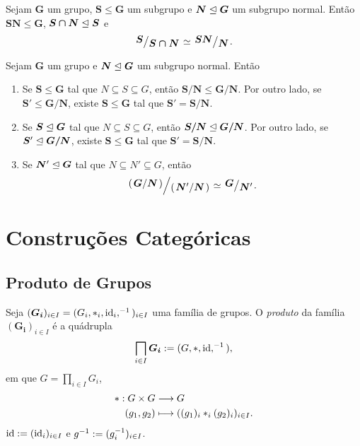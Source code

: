 \begin{teo}
Sejam $\bm G$ um grupo, $\bm S \leq \bm G$ um subgrupo e $\bm N \mathrel{\unlhd} \bm G$ um subgrupo normal. Então $\bm{SN} \leq \bm G$, $\bm{S \cap N} \mathrel{\unlhd} \bm S$ e
	\begin{equation*}
	\bm{\quo{S}{S \cap N}} \simeq \bm{\quo{SN}{N}}.
	\end{equation*}
\end{teo}

\begin{teo}
Sejam $\bm G$ um grupo e $\bm N \mathrel{\unlhd} \bm G$ um subgrupo normal. Então
	\begin{enumerate}
	\item Se $\bm S \leq \bm G$ tal que $N \subseteq S \subseteq G$, então $\bm{S/N} \leq \bm{G/N}$. Por outro lado, se $\bm S' \leq \bm{G/N}$, existe $\bm S \leq \bm G$ tal que $\bm S' = \bm{S/N}$.
	\item Se $\bm S \mathrel{\unlhd} \bm G$ tal que $N \subseteq S \subseteq G$, então $\bm{S/N} \mathrel{\unlhd} \bm{G/N}$. Por outro lado, se $\bm S' \mathrel{\unlhd} \bm{G/N}$, existe $\bm S \leq \bm G$ tal que $\bm S' = \bm{S/N}$.
	\item Se $\bm N' \mathrel{\unlhd} \bm G$ tal que $N \subseteq N' \subseteq G$, então
		\begin{equation*}
		\quo{\left(\quo{\bm G}{\bm N}\right)}{\left(\quo{\bm N'}{\bm N}\right)} \simeq \quo{\bm G}{\bm N'}.
		\end{equation*}
	\end{enumerate}
\end{teo}


\cleardoublepage
\section{Construções Categóricas}

\subsection{Produto de Grupos}

\begin{defi}
Seja $(\bm{G_i})_{i \in I}=(G_i,\ast_i,\mathrm{id}_i,^{-1})_{i \in I}$ uma família de grupos. O \emph{produto} da família $(\bm{G_i})_{i \in I}$ é a quádrupla
	\begin{equation*}
	\prod_{i \in I} \bm{G_i} := (G,\opb,\id,\inv),
	\end{equation*}
em que $G = \prod_{i \in I} G_i$,
	\begin{align*}
	{\ast}: {G \times G} &\longrightarrow {G} \\{(g_1,g_2)} &\longmapsto {((g_1)_i \ast_i (g_2)_i)_{i \in I}}.
	\end{align*}
$\mathrm{id} := (\mathrm{id}_i)_{i \in I}$ e $g^{-1} := (g_i^{-1})_{i \in I}$.
\end{defi}

